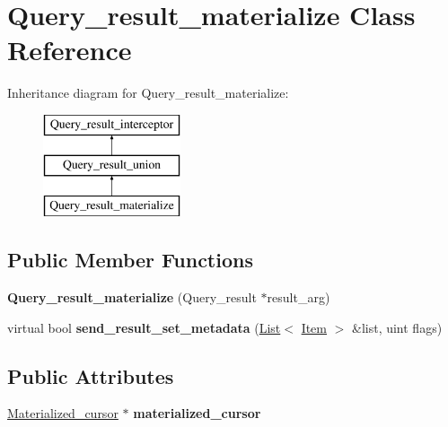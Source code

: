 \hypertarget{classQuery__result__materialize}{}\section{Query\+\_\+result\+\_\+materialize Class Reference}
\label{classQuery__result__materialize}
Inheritance diagram for Query\+\_\+result\+\_\+materialize\+:\begin{figure}[H]
\begin{center}
\leavevmode
\includegraphics[height=3.000000cm]{classQuery__result__materialize}
\end{center}
\end{figure}
\subsection*{Public Member Functions}
\begin{DoxyCompactItemize}
\item 
\mbox{\label{classQuery__result__materialize_a8895b2f72a724d70a0e7c7bbb008f627}} 
{\bfseries Query\+\_\+result\+\_\+materialize} (Query\+\_\+result $\ast$result\+\_\+arg)
\item 
\mbox{\label{classQuery__result__materialize_a026e8154f70e96cb493a9b75460edd6d}} 
virtual bool {\bfseries send\+\_\+result\+\_\+set\+\_\+metadata} (\mbox{\hyperlink{classList}{List}}$<$ \mbox{\hyperlink{classItem}{Item}} $>$ \&list, uint flags)
\end{DoxyCompactItemize}
\subsection*{Public Attributes}
\begin{DoxyCompactItemize}
\item 
\mbox{\label{classQuery__result__materialize_a7823dd95ef97c8c19568dec1259a9de5}} 
\mbox{\hyperlink{classMaterialized__cursor}{Materialized\+\_\+cursor}} $\ast$ {\bfseries materialized\+\_\+cursor}
\end{DoxyCompactItemize}


